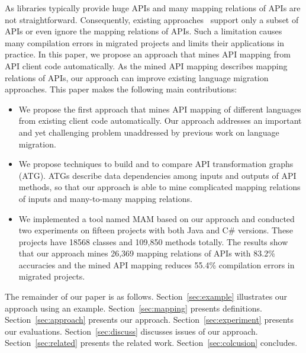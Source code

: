 As libraries typically provide huge APIs and many mapping relations
of APIs are not straightforward. Consequently, existing
approaches~\cite{mossienko2003automated,yasumatsu1995spice,hainaut2008migration}
support only a subset of APIs or even ignore the mapping relations
of APIs. Such a limitation causes many compilation errors in
migrated projects and limits their applications in practice. In this
paper, we propose an approach that mines API mapping from API client
code automatically. As the mined API mapping describes mapping
relations of APIs, our approach can improve existing language
migration approaches. This paper makes the following main
contributions:

\begin{itemize}\vspace*{-1.5ex}
\item We propose the first approach that mines API mapping of
different languages from existing client code automatically. Our
approach addresses an important and yet challenging problem
unaddressed by previous work on language migration.\vspace*{-1.5ex}
\item We propose techniques to build and to compare API
transformation graphs (ATG). ATGs describe data dependencies among
inputs and outputs of API methods, so that our approach is able to
mine complicated mapping relations of inputs and many-to-many
mapping relations.\vspace*{-1.5ex}
\item We
implemented a tool named MAM based on our approach and conducted two
experiments on fifteen projects with both Java and C\# versions.
These projects have 18568 classes and 109,850 methods totally. The
results show that our approach mines 26,369 mapping relations of
APIs with 83.2\% accuracies and the mined API mapping reduces 55.4\%
compilation errors in migrated projects.
\end{itemize}\vspace*{-1.5ex}


The remainder of our paper is as follows. Section~\ref{sec:example}
illustrates our approach using an example. Section~\ref{sec:mapping}
presents definitions. Section~\ref{sec:approach} presents our
approach. Section~\ref{sec:experiment} presents our evaluations.
Section~\ref{sec:discuss} discusses issues of our approach.
Section~\ref{sec:related} presents the related work.
Section~\ref{sec:colcusion} concludes.
